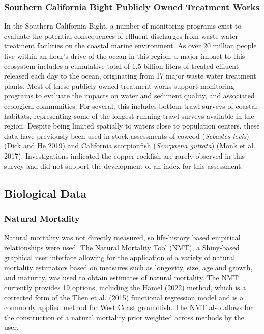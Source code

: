 \documentclass[11pt,
  english,
  letterpaper,
]{article}
\begin{document}
\hypertarget{southern-california-bight-publicly-owned-treatment-works}{%
\subsubsection{Southern California Bight Publicly Owned Treatment Works}\label{southern-california-bight-publicly-owned-treatment-works}}

In the Southern California Bight, a number of monitoring programs exist to evaluate the potential consequences of effluent discharges from waste water treatment facilities on the coastal marine environment. As over 20 million people live within an hour's drive of the ocean in this region, a major impact to this ecosystem includes a cumulative total of 1.5 billion liters of treated effluent released each day to the ocean, originating from 17 major waste water treatment plants. Most of these publicly owned treatment works support monitoring programs to evaluate the impacts on water and sediment quality, and associated ecological communities. For several, this includes bottom trawl surveys of coastal habitats, representing some of the longest running trawl surveys available in the region. Despite being limited spatially to waters close to population centers, these data have previously been used in stock assessments of cowcod (\emph{Sebastes levis}) (Dick and He 2019) and California scorpionfish (\emph{Scorpaena guttata}) (Monk et al. 2017). Investigations indicated the copper rockfish are rarely observed in this survey and did not support the development of an index for this assessment.

\hypertarget{biological-data}{%
\subsection{Biological Data}\label{biological-data}}

\hypertarget{natural-mortality}{%
\subsubsection{Natural Mortality}\label{natural-mortality}}

Natural mortality was not directly measured, so life-history based empirical relationships were used. The Natural Mortality Tool (NMT), a Shiny-based graphical user interface allowing for the application of a variety of natural mortality estimators based on measures such as longevity, size, age and growth, and maturity, was used to obtain estimates of natural mortality. The NMT currently provides 19 options, including the Hamel (2022) method, which is a corrected form of the Then et al. (2015) functional regression model and is a commonly applied method for West Coast groundfish. The NMT also allows for the construction of a natural mortality prior weighted across methods by the user.
\end{document}
